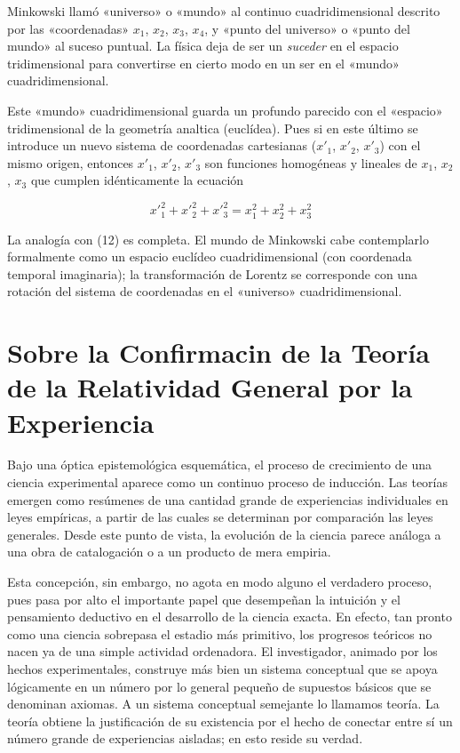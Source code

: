\documentclass[spanish]{book}
\begin{document}
Minkowski llamó «universo» o «mundo» al continuo cuadridimensional descrito por
las «coordenadas» $x_{1}$, $x_{2}$, $x_{3}$, $x_{4}$, y «punto del universo» o «punto del mundo» al
suceso puntual. La física deja de ser un \textit{suceder} en el espacio tridimensional para
convertirse en cierto modo en un ser en el «mundo» cuadridimensional.

Este «mundo» cuadridimensional guarda un profundo parecido con el «espacio»
tridimensional de la geometría analtica (euclídea). Pues si en este último se introduce
un nuevo sistema de coordenadas cartesianas ($x'_{1}$, $x'_{2}$, $x'_{3}$) con el mismo origen,
entonces $x'_{1}$, $x'_{2}$, $x'_{3}$ son funciones homogéneas y lineales de $x_{1}$, $x_{2}$, $x_{3}$ que cumplen
idénticamente la ecuación

\[{x'}_{1}^{2}+{x'}_{2}^{2}+{x'}_{3}^{2}=x_{1}^{2}+x_{2}^{2}+x_{3}^{2}\]

La analogía con (12) es completa. El mundo de Minkowski cabe contemplarlo
formalmente como un espacio euclídeo cuadridimensional (con coordenada temporal
imaginaria); la transformación de Lorentz se corresponde con una rotación del
sistema de coordenadas en el «universo» cuadridimensional.


\chapter{Sobre la Confirmacin de la Teoría de la Relatividad General por la
Experiencia}

Bajo una óptica epistemológica esquemática, el proceso de crecimiento de una ciencia
experimental aparece como un continuo proceso de inducción. Las teorías emergen
como resúmenes de una cantidad grande de experiencias individuales en leyes
empíricas, a partir de las cuales se determinan por comparación las leyes generales.
Desde este punto de vista, la evolución de la ciencia parece análoga a una obra de
catalogación o a un producto de mera empiria.

Esta concepción, sin embargo, no agota en modo alguno el verdadero proceso, pues
pasa por alto el importante papel que desempeñan la intuición y el pensamiento
deductivo en el desarrollo de la ciencia exacta. En efecto, tan pronto como una
ciencia sobrepasa el estadio más primitivo, los progresos teóricos no nacen ya de una
simple actividad ordenadora. El investigador, animado por los hechos experimentales,
construye más bien un sistema conceptual que se apoya lógicamente en un número por
lo general pequeño de supuestos básicos que se denominan axiomas. A un sistema
conceptual semejante lo llamamos teoría. La teoría obtiene la justificación de su
existencia por el hecho de conectar entre sí un número grande de experiencias
aisladas; en esto reside su verdad.
\end{document}

